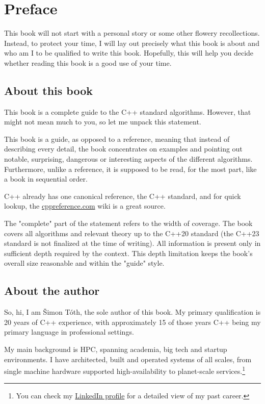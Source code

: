 \chapter{Preface}

This book will not start with a personal story or some other flowery recollections. Instead, to protect your time, I will lay out precisely what this book is about and who am I to be qualified to write this book. Hopefully, this will help you decide whether reading this book is a good use of your time.

\section*{About this book}

This book is a complete guide to the C++ standard algorithms. However, that might not mean much to you, so let me unpack this statement.

This book is a guide, as opposed to a reference, meaning that instead of describing every detail, the book concentrates on examples and pointing out notable, surprising, dangerous or interesting aspects of the different algorithms. Furthermore, unlike a reference, it is supposed to be read, for the most part, like a book in sequential order.

C++ already has one canonical reference, the C++ standard, and for quick lookup, the \href{https://cppreference.com}{cppreference.com} wiki is a great source.

The "complete" part of the statement refers to the width of coverage. The book covers all algorithms and relevant theory up to the C++20 standard (the C++23 standard is not finalized at the time of writing). All information is present only in sufficient depth required by the context. This depth limitation keeps the book's overall size reasonable and within the "guide" style.

\section*{About the author}

So, hi, I am Šimon Tóth, the sole author of this book. My primary qualification is 20 years of C++ experience, with approximately 15 of those years C++ being my primary language in professional settings.

My main background is HPC, spanning academia, big tech and startup environments. I have architected, built and operated systems of all scales, from single machine hardware supported high-availability to planet-scale services.\footnote{You can check my \href{https://cz.linkedin.com/in/simontoth}{LinkedIn profile} for a detailed view of my past career.}

